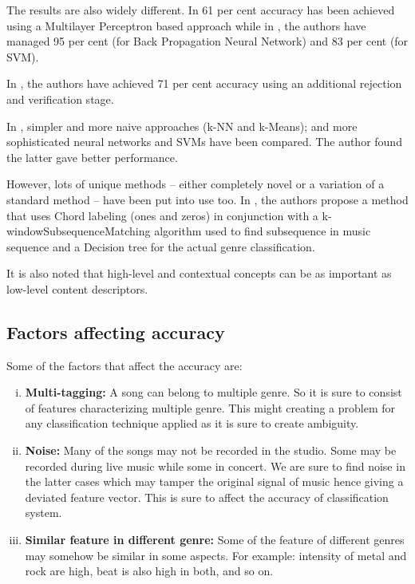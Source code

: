 The results are also widely different. In \cite{Neumayer2004} 61 per cent accuracy has been achieved using a Multilayer Perceptron based approach while
in \cite{Kour2015}, the authors have managed 95 per cent (for Back Propagation Neural Network) and 83 per cent (for SVM).

In \cite{Koerich2013}, the authors have achieved 71 per cent accuracy using an additional rejection and verification stage.

In \cite{Haggblade2011}, simpler and more naive approaches (k-NN and k-Means); and more sophisticated neural networks and SVMs have been compared. The
author found the latter gave better performance.

However, lots of unique methods -- either completely novel or a variation of a standard method -- have been put into use too. In \cite{Nasridinov2014}, the authors
propose a method that uses Chord labeling (ones and zeros) in conjunction with a k-windowSubsequenceMatching algorithm used to find subsequence in music sequence
and a Decision tree for the actual genre classification.

It is also noted that high-level and contextual concepts can be as important as low-level content descriptors. \cite{Anglade2010} 

\subsection{Factors affecting accuracy}
Some of the factors that affect the accuracy are: 
\begin{enumerate}[(i)] 
        \item \textbf{Multi-tagging:} A song can belong to multiple genre. So it is sure to consist of features characterizing multiple genre. This might creating a
                problem for any classification technique applied as it is sure to create ambiguity. 
        \item \textbf{Noise:} Many of the songs may not be recorded in the studio. Some may be recorded during live music while some in concert. We are sure to find
                noise in the latter cases which may tamper the original signal of music hence giving a deviated feature vector. This is sure to affect the accuracy of classification system.
        \item \textbf{Similar feature in different genre:} Some of the feature of different genres may somehow be similar in some aspects. For example: intensity of metal
                and rock are high, beat is also high in both, and so on. 
\end{enumerate}
